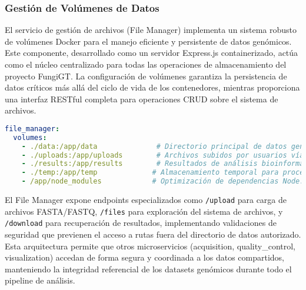 \subsubsection{Gestión de Volúmenes de Datos}

El servicio de gestión de archivos (File Manager) implementa un sistema robusto de volúmenes Docker para el manejo eficiente y persistente de datos genómicos. Este componente, desarrollado como un servidor Express.js containerizado, actúa como el núcleo centralizado para todas las operaciones de almacenamiento del proyecto FungiGT. La configuración de volúmenes garantiza la persistencia de datos críticos más allá del ciclo de vida de los contenedores, mientras proporciona una interfaz RESTful completa para operaciones CRUD sobre el sistema de archivos.

\begin{lstlisting}[language=yaml, caption=Configuración de volúmenes de datos del File Manager]
file_manager:
  volumes:
    - ./data:/app/data              # Directorio principal de datos genómicos
    - ./uploads:/app/uploads        # Archivos subidos por usuarios vía API
    - ./results:/app/results        # Resultados de análisis bioinformáticos
    - ./temp:/app/temp             # Almacenamiento temporal para procesamiento
    - /app/node_modules            # Optimización de dependencias Node.js
\end{lstlisting}

El File Manager expone endpoints especializados como \texttt{/upload} para carga de archivos FASTA/FASTQ, \texttt{/files} para exploración del sistema de archivos, y \texttt{/download} para recuperación de resultados, implementando validaciones de seguridad que previenen el acceso a rutas fuera del directorio de datos autorizado. Esta arquitectura permite que otros microservicios (acquisition, quality\_control, visualization) accedan de forma segura y coordinada a los datos compartidos, manteniendo la integridad referencial de los datasets genómicos durante todo el pipeline de análisis. 